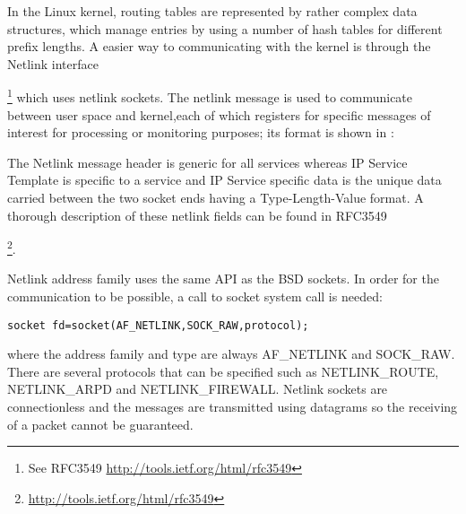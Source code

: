 In the Linux kernel, routing tables are represented by rather complex data structures, which manage entries by using a number of hash tables for different prefix lengths. A easier way to communicating with the kernel is through the Netlink interface{\footnote{See RFC3549 \url{http://tools.ietf.org/html/rfc3549}} which uses netlink sockets.
The netlink message is used to communicate between user space and kernel,each of which registers for specific messages of interest for processing or monitoring purposes; its format is shown in :

The Netlink message header is generic for all services whereas IP Service Template is specific to a service and IP Service specific data is the unique data carried between the two socket ends having a Type-Length-Value format. A thorough description of these netlink fields can be found in RFC3549 {\footnote{\url{http://tools.ietf.org/html/rfc3549}}.

Netlink address family uses the same API as the BSD sockets. In order for the communication to be possible, a call to socket system call is needed:
\begin{lstlisting}
socket fd=socket(AF_NETLINK,SOCK_RAW,protocol);
\end{lstlisting}
where the address family and type are always AF_NETLINK and SOCK_RAW. There are several protocols that can be specified such as NETLINK_ROUTE, NETLINK_ARPD and NETLINK_FIREWALL.
Netlink sockets are connectionless and the messages are transmitted using datagrams so the receiving of a packet cannot be guaranteed.

}}
